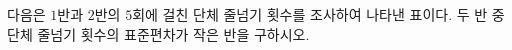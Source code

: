 다음은 $1$반과 $2$반의 $5$회에 걸친 단체 줄넘기 횟수를 조사하여 나타낸 표이다. 두 반 중 단체 줄넘기 횟수의 표준편차가 작은 반을 구하시오.
\par\smallskip\begin{center}\resizebox{\ifdim\width>\linewidth\linewidth\else\width\fi}{!}{}\end{center}
